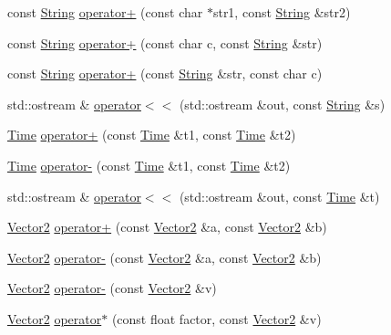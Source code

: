 \begin{DoxyCompactItemize}
\item 
const \hyperlink{classprism_1_1_string}{String} \hyperlink{namespaceprism_a7d59729f69eafd3bc9f4d30ad9dd06b6}{operator+} (const char $\ast$str1, const \hyperlink{classprism_1_1_string}{String} \&str2)
\item 
const \hyperlink{classprism_1_1_string}{String} \hyperlink{namespaceprism_aa0fce6a8b93050fcb6db327e68b701e3}{operator+} (const char c, const \hyperlink{classprism_1_1_string}{String} \&str)
\item 
const \hyperlink{classprism_1_1_string}{String} \hyperlink{namespaceprism_a8ae68ccc6eb3a47a748671c1a7af88ca}{operator+} (const \hyperlink{classprism_1_1_string}{String} \&str, const char c)
\item 
std\+::ostream \& \hyperlink{namespaceprism_a0a166bbf645cc854542cc0fc50324670}{operator$<$$<$} (std\+::ostream \&out, const \hyperlink{classprism_1_1_string}{String} \&s)
\item 
\hyperlink{classprism_1_1_time}{Time} \hyperlink{namespaceprism_afd483f03b731881b25da5612b1213e5f}{operator+} (const \hyperlink{classprism_1_1_time}{Time} \&t1, const \hyperlink{classprism_1_1_time}{Time} \&t2)
\item 
\hyperlink{classprism_1_1_time}{Time} \hyperlink{namespaceprism_aa18009df22007fbbde08ab44b16a9a31}{operator-\/} (const \hyperlink{classprism_1_1_time}{Time} \&t1, const \hyperlink{classprism_1_1_time}{Time} \&t2)
\item 
std\+::ostream \& \hyperlink{namespaceprism_a7c24ead13d51c13dcadde1b6df4a4967}{operator$<$$<$} (std\+::ostream \&out, const \hyperlink{classprism_1_1_time}{Time} \&t)
\item 
\hyperlink{classprism_1_1_vector2}{Vector2} \hyperlink{namespaceprism_ae482804c32b466401a9ecdf26bc1e6de}{operator+} (const \hyperlink{classprism_1_1_vector2}{Vector2} \&a, const \hyperlink{classprism_1_1_vector2}{Vector2} \&b)
\item 
\hyperlink{classprism_1_1_vector2}{Vector2} \hyperlink{namespaceprism_a86359a88dc5245847de48575a1f969e8}{operator-\/} (const \hyperlink{classprism_1_1_vector2}{Vector2} \&a, const \hyperlink{classprism_1_1_vector2}{Vector2} \&b)
\item 
\hyperlink{classprism_1_1_vector2}{Vector2} \hyperlink{namespaceprism_a124f1081b3a9bbc441dac9927f8a0fc5}{operator-\/} (const \hyperlink{classprism_1_1_vector2}{Vector2} \&v)
\item 
\hyperlink{classprism_1_1_vector2}{Vector2} \hyperlink{namespaceprism_a6528ec4496096e8ccde186bb01fbeed3}{operator$\ast$} (const float factor, const \hyperlink{classprism_1_1_vector2}{Vector2} \&v)

\end{DoxyCompactItemize}
